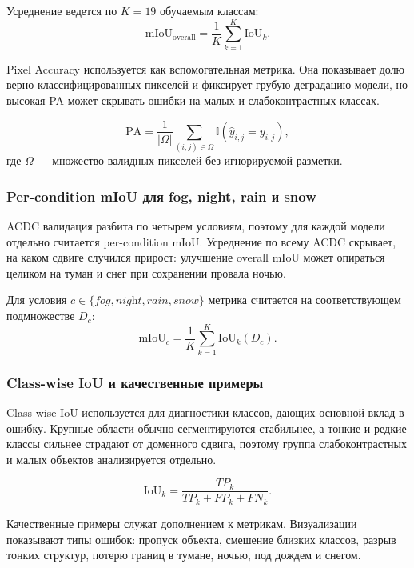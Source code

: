 \documentclass[14pt,a4paper]{extarticle}
\begin{document}
Усреднение ведется по $K = 19$ обучаемым классам:
\begin{equation}
    \text{mIoU}_{\text{overall}} =
    \frac{1}{K}\sum_{k=1}^{K}\text{IoU}_k.
\end{equation}

Pixel Accuracy используется как вспомогательная метрика. Она показывает долю верно классифицированных пикселей и фиксирует грубую деградацию модели, но высокая PA может скрывать ошибки на малых и слабоконтрастных классах.

\begin{equation}
    \text{PA} =
    \frac{1}{|\Omega|}\sum_{(i,j)\in\Omega}
    \mathbb{I}\left(\hat{y}_{i,j}=y_{i,j}\right),
\end{equation}
где $\Omega$ --- множество валидных пикселей без игнорируемой разметки.

\subsubsection{Per-condition mIoU для fog, night, rain и snow}

ACDC валидация разбита по четырем условиям, поэтому для каждой модели отдельно считается per-condition mIoU. Усреднение по всему ACDC скрывает, на каком сдвиге случился прирост: улучшение overall mIoU может опираться целиком на туман и снег при сохранении провала ночью.

Для условия $c \in \{\textit{fog}, \textit{night}, \textit{rain}, \textit{snow}\}$ метрика считается на соответствующем подмножестве $D_c$:
\begin{equation}
    \text{mIoU}_{c} =
    \frac{1}{K}\sum_{k=1}^{K}\text{IoU}_k(D_c).
\end{equation}

\subsubsection{Class-wise IoU и качественные примеры}

Class-wise IoU используется для диагностики классов, дающих основной вклад в ошибку. Крупные области обычно сегментируются стабильнее, а тонкие и редкие классы сильнее страдают от доменного сдвига, поэтому группа слабоконтрастных и малых объектов анализируется отдельно.

\begin{equation}
    \text{IoU}_k =
    \frac{TP_k}{TP_k + FP_k + FN_k}.
\end{equation}

Качественные примеры служат дополнением к метрикам. Визуализации показывают типы ошибок: пропуск объекта, смешение близких классов, разрыв тонких структур, потерю границ в тумане, ночью, под дождем и снегом.
\end{document}
